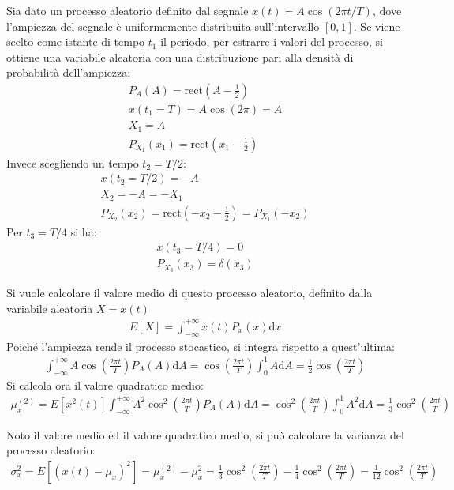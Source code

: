 \documentclass{article}
\newcommand{\rect}{\mathrm{rect}}
\newcommand{\df}{\mathrm{d}}
\numberwithin{equation}{subsection}
\begin{document}
Sia dato un processo aleatorio definito dal segnale $x(t)=A\cos(2\pi t/T)$, dove l'ampiezza del segnale è uniformemente distribuita sull'intervallo $[0,1]$. 
Se viene scelto come istante di tempo $t_1$ il periodo, per estrarre i valori del processo, si ottiene una variabile aleatoria con una distribuzione pari alla densità di probabilità 
dell'ampiezza:
\begin{gather*}
    P_A(A)=\rect\displaystyle\left(A-\frac{1}{2}\right)\\
    x(t_1=T)=A\cos(2\pi)=A\\
    X_1=A\\
    P_{X_1}(x_1)=\displaystyle\rect\left(x_1-\frac{1}{2}\right)
\end{gather*}
Invece scegliendo un tempo $t_2=T/2$:
\begin{gather*}
    x(t_2=T/2)=-A\\
    X_2=-A=-X_1\\
    P_{X_2}(x_2)=\displaystyle\rect\left(-x_2-\frac{1}{2}\right)=P_{X_1}(-x_2)
\end{gather*}
Per $t_3=T/4$ si ha:
\begin{gather*}
    x(t_3=T/4)=0\\
    P_{X_3}(x_3)=\delta(x_3)
\end{gather*}

Si vuole calcolare il valore medio di questo processo aleatorio, definito dalla variabile aleatoria $X=x(t)$
\begin{gather*}
    E[X]=\displaystyle\int_{-\infty}^{+\infty}x(t)P_x(x)\df x
\end{gather*}
Poiché l'ampiezza rende il processo stocastico, si integra rispetto a quest'ultima:
\begin{gather*}
    \displaystyle\int_{-\infty}^{+\infty}A\cos\left(\frac{2\pi t}{T}\right)P_A(A)\df A=\cos\left(\frac{2\pi t}{T}\right)\int_0^1A\df A=\frac{1}{2}\cos\left(\frac{2\pi t}{T}\right)
\end{gather*}
Si calcola ora il valore quadratico medio:
\begin{gather*}
    \mu_x^{(2)}=E[x^2(t)]\displaystyle\int_{-\infty}^{+\infty}A^2\cos^2\left(\frac{2\pi t}{T}\right)P_A(A)\df A=\cos^2\left(\frac{2\pi t}{T}\right)\int_0^1A^2\df A=\frac{1}{3}\cos^2\left(\frac{2\pi t}{T}\right)
\end{gather*}


Noto il valore medio ed il valore quadratico medio, si può calcolare la varianza del processo aleatorio:
\begin{gather*}
    \sigma_x^2=E[(x(t)-\mu_x)^2]=\mu_x^{(2)}-\mu_x^2=\displaystyle\frac{1}{3}\cos^2\left(\frac{2\pi t}{T}\right)-\frac{1}{4}\cos^2\left(\frac{2\pi t}{T}\right)=\frac{1}{12}\cos^2\left(\frac{2\pi t}{T}\right)
\end{gather*}
\end{document}
